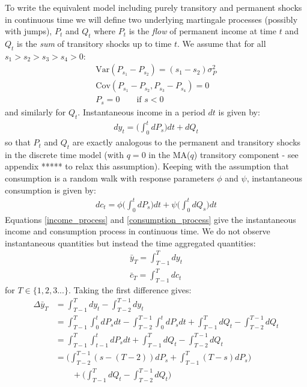 \documentclass[titlepage]{\econtex}\newcommand{\texname}{IncomeUncertainty}
\begin{document}
To write the equivalent model including purely transitory and permanent shocks in continuous time we will define two underlying martingale processes (possibly with jumps), $P_t$ and $Q_t$ where $P_t$ is the \textit{flow} of permanent income at time $t$ and $Q_t$ is the \textit{sum} of transitory shocks up to time $t$. We assume that for all  $s_1>s_2>s_3>s_4>0$:
\begin{align*}
\mathrm{Var}(P_{s_1}-P_{s_2})=(s_1-s_2)\sigma_P^2 \\
\mathrm{Cov}(P_{s_1}-P_{s_2},P_{s_3}-P_{s_4}) = 0 \\
P_s = 0 \qquad \text{if } s<0
\end{align*}
and similarly for $Q_t$. Instantaneous income in a period $dt$ is given by:
\begin{align}
dy_t = \Big( \int_{0}^{t}dP_s \Big) dt  +dQ_t \label{income_process}
\end{align}
so that $P_t$ and $Q_t$ are exactly analogous to the permanent and transitory shocks in the discrete time model (with $q=0$ in the MA($q$) transitory component - see appendix ***** to relax this assumption). Keeping with the assumption that consumption is a random walk with response parameters $\phi$ and $\psi$, instantaneous consumption is given by:
\begin{align}
dc_t = \phi \Big( \int_{0}^{t} dP_s  \Big) dt +\psi\Big( \int_{0}^{t}dQ_s\Big) dt  \label{consumption_process}
\end{align}
Equations \ref{income_process} and \ref{consumption_process} give the instantaneous income and consumption process in continuous time. We do not observe instantaneous quantities but instead the time aggregated quantities:
\begin{align}
\bar{y}_T = \int_{T-1}^{T} dy_t \label{income_TA}\\
\bar{c}_T = \int_{T-1}^{T} dc_t \label{cons_TA}
\end{align}
for $T \in \{1,2,3...\}$. Taking the first difference gives:
\begin{align}
\Delta \bar{y}_T &= \int_{T-1}^{T} dy_t  - \int_{T-2}^{T-1} dy_t  \nonumber \\ 
&= \int_{T-1}^{T} \int_{0}^{t}dP_s dt -\int_{T-2}^{T-1} \int_{0}^{t}dP_s dt +  \int_{T-1}^{T} dQ_t -\int_{T-2}^{T-1} dQ_t \nonumber \\
&= \int_{T-1}^{T} \int_{t-1}^{t}dP_s dt +  \int_{T-1}^{T} dQ_t -\int_{T-2}^{T-1} dQ_t \nonumber \\
&= \Big(\int_{T-2}^{T-1} (s-(T-2))dP_s  + \int_{T-1}^{T} (T-s)dP_s \Big) \nonumber \\
& \qquad + \Big(\int_{T-1}^{T} dQ_t -\int_{T-2}^{T-1} dQ_t \Big) \label{deltay}
\end{align}
\end{document}

